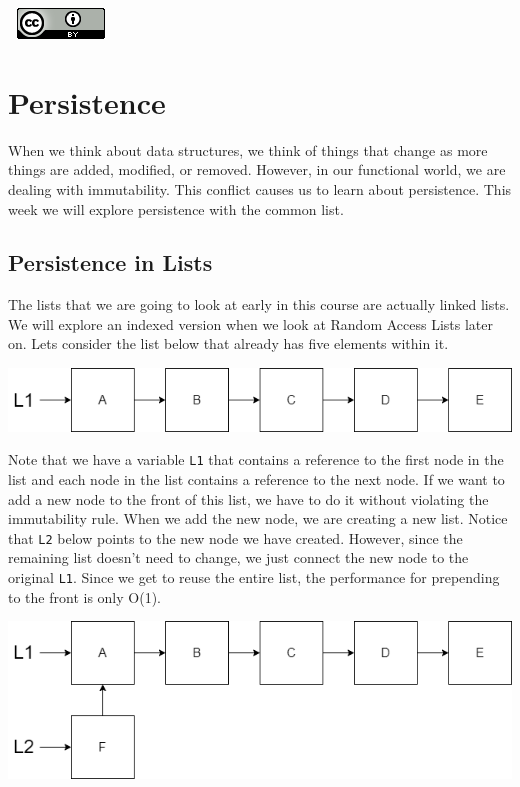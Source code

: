 \documentclass[
]{book}
\begin{document}
\(\nonumber\)
\(\nonumber\)
\href{http://creativecommons.org/licenses/by/4.0/}{\includegraphics{images/cc-88x31.png}}

\hypertarget{persistence}{%
\chapter{Persistence}\label{persistence}}

When we think about data structures, we think of things that change as more things are added, modified, or removed. However, in our functional world, we are dealing with immutability. This conflict causes us to learn about persistence. This week we will explore persistence with the common list.

\hypertarget{persistence-in-lists}{%
\section{Persistence in Lists}\label{persistence-in-lists}}

The lists that we are going to look at early in this course are actually linked lists. We will explore an indexed version when we look at Random Access Lists later on. Lets consider the list below that already has five elements within it.

\includegraphics{images/FiveElementList.drawio.png}

Note that we have a variable \texttt{L1} that contains a reference to the first node in the list and each node in the list contains a reference to the next node. If we want to add a new node to the front of this list, we have to do it without violating the immutability rule. When we add the new node, we are creating a new list. Notice that \texttt{L2} below points to the new node we have created. However, since the remaining list doesn't need to change, we just connect the new node to the original \texttt{L1}. Since we get to reuse the entire list, the performance for prepending to the front is only O(1).

\includegraphics{images/FiveElementListPrepend.drawio.png}
\end{document}

